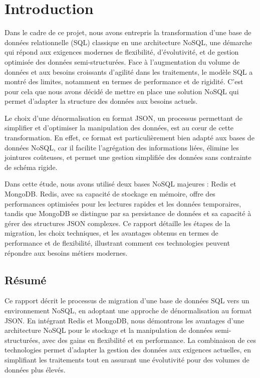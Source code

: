 \chapter{Introduction}

Dans le cadre de ce projet, nous avons entrepris la transformation d'une base de données relationnelle (SQL) classique en une architecture NoSQL, une démarche qui répond aux exigences modernes de flexibilité, d'évolutivité, et de gestion optimisée des données semi-structurées. Face à l’augmentation du volume de données et aux besoins croissants d’agilité dans les traitements, le modèle SQL a montré des limites, notamment en termes de performance et de rigidité. C’est pour cela que nous avons décidé de mettre en place une solution NoSQL qui permet d’adapter la structure des données aux besoins actuels.

Le choix d'une dénormalisation en format JSON, un processus permettant de simplifier et d’optimiser la manipulation des données, est au cœur de cette transformation. En effet, ce format est particulièrement bien adapté aux bases de données NoSQL, car il facilite l’agrégation des informations liées, élimine les jointures coûteuses, et permet une gestion simplifiée des données sans contrainte de schéma rigide.

Dans cette étude, nous avons utilisé deux bases NoSQL majeures : Redis et MongoDB. Redis, avec sa capacité de stockage en mémoire, offre des performances optimisées pour les lectures rapides et les données temporaires, tandis que MongoDB se distingue par sa persistance de données et sa capacité à gérer des structures JSON complexes. Ce rapport détaille les étapes de la migration, les choix techniques, et les avantages obtenus en termes de performance et de flexibilité, illustrant comment ces technologies peuvent répondre aux besoins métiers modernes.

\vspace{1cm}

\section*{Résumé}
Ce rapport décrit le processus de migration d'une base de données SQL vers un environnement NoSQL, en adoptant une approche de dénormalisation au format JSON. En intégrant Redis et MongoDB, nous démontrons les avantages d'une architecture NoSQL pour le stockage et la manipulation de données semi-structurées, avec des gains en flexibilité et en performance. La combinaison de ces technologies permet d'adapter la gestion des données aux exigences actuelles, en simplifiant les traitements tout en assurant une évolutivité pour des volumes de données plus élevés.

\newpage
